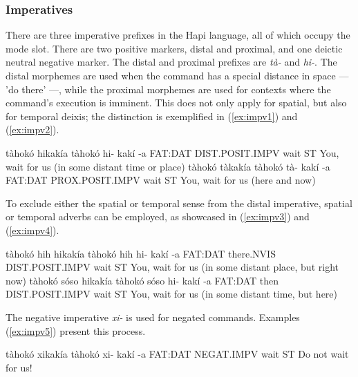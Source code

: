 \documentclass[a4paper, 12pt, oneside]{memoir}
\newcommand{\emh}[1]{\textit{#1}}
\begin{document}
\subsubsection{Imperatives}
There are three imperative prefixes in the Hapi language, all of which occupy the mode slot. There are two positive markers, distal and proximal, and one deictic neutral negative marker. The distal and proximal prefixes are \emh{tà-} and \emh{hi-}. The distal morphemes are used when the command has a special distance in space — 'do there' —, while the proximal morphemes are used for contexts where the command's execution is imminent. This does not only apply for spatial, but also for temporal deixis; the distinction is exemplified in (\ref{ex:impv1}) and (\ref{ex:impv2}). 
\begin{examples}
    \ex \label{ex:impv1}
    \words tàhokó hikakía
    \bits tàhokó  hi- kakí -a 
    \gloss FAT:DAT DIST.POSIT.IMPV wait ST
    \tr You, wait for us (in some distant time or place)
    \ex \label{ex:impv2}
    \words tàhokó tàkakía
    \bits tàhokó  tà- kakí -a 
    \gloss FAT:DAT PROX.POSIT.IMPV wait ST
    \tr You, wait for us (here and now)
\end{examples}
To exclude either the spatial or temporal sense from the distal imperative, spatial or temporal adverbs can be employed, as showcased in (\ref{ex:impv3}) and (\ref{ex:impv4}).
\begin{examples}
    \ex \label{ex:impv3}
    \words tàhokó hih hikakía
    \bits tàhokó hih hi- kakí -a
    \gloss FAT:DAT there.NVIS DIST.POSIT.IMPV wait ST
    \tr You, wait for us (in some distant place, but right now)
    \ex \label{ex:impv4}
    \words tàhokó sóso hikakía
    \bits tàhokó sóso hi- kakí -a
    \gloss FAT:DAT then DIST.POSIT.IMPV wait ST
    \tr You, wait for us (in some distant time, but here)
\end{examples}
The negative imperative \emh{xi-} is used for negated commands. Examples (\ref{ex:impv5}) present this process.
\begin{examples}
    \ex \label{ex:impv5}
    \words tàhokó xikakía
    \bits tàhokó xi- kakí -a
    \gloss FAT:DAT NEGAT.IMPV wait ST
    \tr Do not wait for us!
\end{examples}
\end{document}
